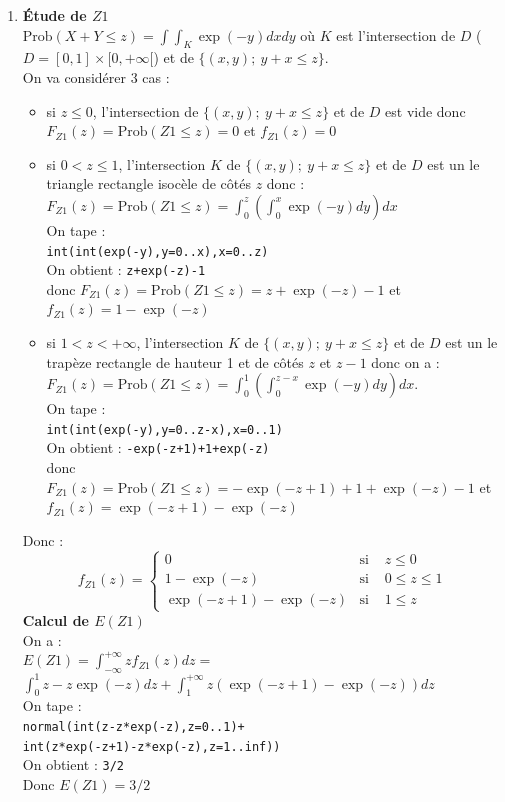 \documentclass[a4paper,11pt]{book}
\begin{document}
\begin{enumerate}
\begin{enumerate}
\item {\bf \'Etude de $Z1$}\\
$\mbox{Prob}(X+Y\leq z)=\int\int_K\exp(-y)dxdy$ o\`u $K$ est l'intersection de  
$D$ ($D=[0,1]\times [0,+\infty[$) et de $\{(x,y);\  y+x\leq z\}$.\\
On va consid\'erer 3 cas :
\begin{itemize}
\item si $z\leq 0$, l'intersection de $\{(x,y);\   y+x\leq z\}$ et de $D$ est 
vide donc
 $F_{Z1}(z)=\mbox{Prob}(Z1\leq z)=0$ et $f_{Z1}(z)=0$
\item si $0<z\leq 1$, l'intersection $K$ de $\{(x,y);\   y+x\leq z\}$ et de $D$
est un le triangle rectangle isoc\`ele de c\^ot\'es $z$ donc :\\
$F_{Z1}(z)=\mbox{Prob}(Z1\leq z)=\int_0^z(\int_0^x\exp(-y)dy)dx$\\
On tape :\\
{\tt int(int(exp(-y),y=0..x),x=0..z)}\\
On obtient : {\tt z+exp(-z)-1}\\ 
donc
 $F_{Z1}(z)=\mbox{Prob}(Z1\leq z)=z+\exp(-z)-1$ et $f_{Z1}(z)=1-\exp(-z)$
\item si $1<z<+\infty$, l'intersection $K$ de $\{(x,y);\   y+x\leq z\}$ et de 
$D$ est un le trap\`eze  rectangle de hauteur 1 et de 
c\^ot\'es $z$ et $z-1$ donc on a :\\
$F_{Z1}(z)=\mbox{Prob}(Z1\leq z)=\int_0^1(\int_0^{z-x}\exp(-y)dy)dx$.\\
On tape :\\
{\tt int(int(exp(-y),y=0..z-x),x=0..1)}\\
On obtient : {\tt -exp(-z+1)+1+exp(-z)}\\
donc
 $F_{Z1}(z)=\mbox{Prob}(Z1\leq z)=-\exp(-z+1)+1+\exp(-z)-1$ et 
$f_{Z1}(z)=\exp(-z+1)-\exp(-z)$
\end{itemize}
Donc :
$$
f_{Z1}(z)=
\left\{
\begin{array}{rll}
0 & \mbox{si }& z\leq 0 \\
1-\exp(-z) & \mbox{si }&0\leq z \leq 1\\
\exp(-z+1)-\exp(-z) & \mbox{si }&1\leq z
\end{array}
\right.
$$
{\bf Calcul de $E(Z1)$}\\
On a :\\
$\displaystyle E(Z1)=\int_{-\infty}^{+\infty}zf_{Z1}(z)dz=$\\
$\displaystyle \int_0^1z-z\exp(-z)dz+\int_1^{+\infty}z(\exp(-z+1)-\exp(-z))dz$\\
On tape :\\
{\tt normal(int(z-z*exp(-z),z=0..1)+\\int(z*exp(-z+1)-z*exp(-z),z=1..inf))}\\
On obtient : {\tt 3/2}\\
Donc $E(Z1)=3/2$


\end{enumerate}
\end{enumerate}
\end{document}
